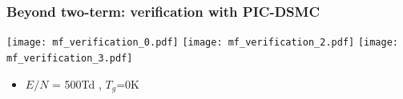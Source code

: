 \documentclass[mathserif, aspectratio=169]{beamer}
\begin{document}



\begin{frame}
	\frametitle{Beyond two-term: verification with PIC-DSMC}
	\vspace{-0.25in}
	\begin{center}
		\texttt{[image: mf\_verification\_0.pdf]}
		\texttt{[image: mf\_verification\_2.pdf]}
		\texttt{[image: mf\_verification\_3.pdf]}
	\end{center}
	\begin{itemize}
		\item $E/N$ = 500Td , $T_g$=0K
	\end{itemize}
\end{frame}
\end{document}
